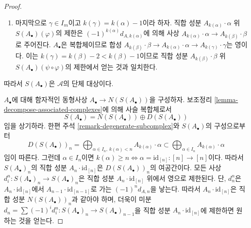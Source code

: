 \begin{proof}
\begin{enumerate}
\begin{enumerate}
$\Im(\gamma) = \Im(\alpha)$이다. 이 경우 직합 성분
$A_{k(\beta)} \cdot \beta$ 위 $S(A_\bullet)(\psi \circ \varphi)$의 제한은
$A_{k(\gamma)} \cdot \gamma$로 가는
$(-1)^{k(\beta)}d_{A, k(\beta)}$로 주어지고, 직합 성분
$A_{k(\alpha)} \cdot \alpha$ 위 $S(A_\bullet)(\varphi)$의 제한은
항등사상 $A_{k(\alpha)} \cdot \alpha \to A_{k(\gamma)} \cdot \gamma$이다.
따라서 일치한다.
\item 마지막으로 $\gamma \in I_m$이고
$k(\gamma) = k(\alpha) - 1$이라 하자. 직합 성분
$A_{k(\alpha)} \cdot \alpha$ 위 $S(A_\bullet)(\varphi)$의 제한은
$(-1)^{k(\alpha)} d_{A, k(\alpha)}$에 의해 사상
$A_{k(\alpha)} \cdot \alpha \to A_{k(\beta)} \cdot \beta$로 주어진다.
$A_\bullet$은 복합체이므로 합성
$A_{k(\beta)} \cdot \beta \to
A_{k(\alpha)} \cdot \alpha \to A_{k(\gamma)} \cdot \gamma$는 영이다.
이는 $k(\gamma) = k(\beta) - 2 < k(\beta) - 1$이므로 직합 성분
$A_{k(\beta)} \cdot \beta$ 위 $S(A_\bullet)(\psi \circ \varphi)$의
제한에서 얻는 것과 일치한다.
\end{enumerate}
\end{enumerate}
따라서 $S(A_\bullet)$은 $\mathcal{A}$의 단체 대상이다.

\medskip\noindent
$A_\bullet$에 대해 함자적인 동형사상
$A_\bullet \to N(S(A_\bullet))$을 구성하자. 보조정리
\ref{lemma-decompose-associated-complexes}에 의해 사슬 복합체로서
$$
S(A_\bullet) =  N(S(A_\bullet)) \oplus D(S(A_\bullet))
$$
임을 상기하라. 한편 주석 \ref{remark-degenerate-subcomplex}와
$S(A_\bullet)$의 구성으로부터
$$
D(S(A_\bullet))_n =
\bigoplus\nolimits_{\alpha \in I_n,\ k(\alpha) < n} A_{k(\alpha)} \cdot \alpha
\subset
\bigoplus\nolimits_{\alpha \in I_n} A_{k(\alpha)} \cdot \alpha
$$
임이 따른다. 그런데 $\alpha \in I_n$이면
$k(\alpha) \geq n \Leftrightarrow \alpha = \text{id}_{[n]} : [n] \to [n]$이다.
따라서 $S(A_\bullet)_n$의 직합 성분
$A_n \cdot \text{id}_{[n]}$은 $D(S(A_\bullet))_n$의 여공간이다.
모든 사상 $d^n_i : S(A_\bullet)_n \to S(A_\bullet)_n$은 직합 성분
$A_n \cdot \text{id}_{[n]}$ 위에서 영으로 제한된다. 단,
$d^n_n$은 $A_n \cdot \text{id}_{[n]}$에서
$A_{n - 1} \cdot \text{id}_{[n - 1]}$로 가는
$(-1)^n d_{A, n}$을 낳는다. 따라서 $A_n \cdot \text{id}_{[n]}$은
직합 성분 $N(S(A_\bullet))_n$과 같아야 하며, 더욱이 미분
$d_n = \sum (-1)^id^n_i : S(A_\bullet)_n \to S(A_\bullet)_{n - 1}$을
직합 성분 $A_n \cdot \text{id}_{[n]}$에 제한하면 원하는 것을 얻는다.


\end{proof}
